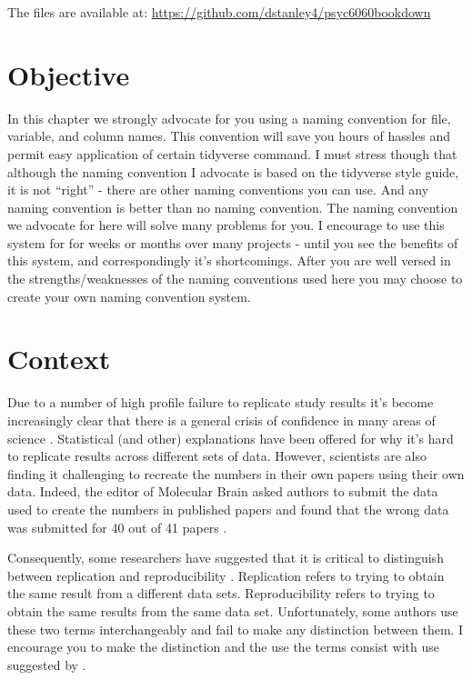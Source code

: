 \documentclass[
]{krantz}
\begin{document}
The files are available at: \url{https://github.com/dstanley4/psyc6060bookdown}

\hypertarget{objective-1}{%
\section{Objective}\label{objective-1}}

In this chapter we strongly advocate for you using a naming convention for file, variable, and column names. This convention will save you hours of hassles and permit easy application of certain tidyverse command. I must stress though that although the naming convention I advocate is based on the tidyverse style guide, it is not ``right'' - there are other naming conventions you can use. And any naming convention is better than no naming convention. The naming convention we advocate for here will solve many problems for you. I encourage to use this system for for weeks or months over many projects - until you see the benefits of this system, and correspondingly it's shortcomings. After you are well versed in the strengths/weaknesses of the naming conventions used here you may choose to create your own naming convention system.

\hypertarget{context}{%
\section{Context}\label{context}}

Due to a number of high profile failure to replicate study results \citep{cos2015} it's become increasingly clear that there is a general crisis of confidence in many areas of science \citep{baker2016}. Statistical (and other) explanations have been offered \citep{simmons2011} for why it's hard to replicate results across different sets of data. However, scientists are also finding it challenging to recreate the numbers in their own papers using their own data. Indeed, the editor of Molecular Brain asked authors to submit the data used to create the numbers in published papers and found that the wrong data was submitted for 40 out of 41 papers \citep{miyakawa2020}.

Consequently, some researchers have suggested that it is critical to distinguish between replication and reproducibility \citep{patil2019}. Replication refers to trying to obtain the same result from a different data sets. Reproducibility refers to trying to obtain the same results from the same data set. Unfortunately, some authors use these two terms interchangeably and fail to make any distinction between them. I encourage you to make the distinction and the use the terms consist with use suggested by \citep{patil2019}.
\end{document}
